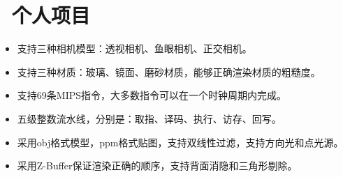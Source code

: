 \documentclass{resume}
\begin{document}
\section{\texorpdfstring{\faGithubAlt\ 个人项目}{个人项目}}
\begin{itemize}
  \item 支持三种相机模型：透视相机、鱼眼相机、正交相机。
  \item 支持三种材质：玻璃、镜面、磨砂材质，能够正确渲染材质的粗糙度。
\end{itemize}

\begin{itemize}
  \item 支持69条MIPS指令，大多数指令可以在一个时钟周期内完成。
  \item 五级整数流水线，分别是：取指、译码、执行、访存、回写。
\end{itemize}


\begin{itemize}
  \item 采用obj格式模型，ppm格式贴图，支持双线性过滤，支持方向光和点光源。
  \item 采用Z-Buffer保证渲染正确的顺序，支持背面消隐和三角形剔除。
\end{itemize}

\end{document}
